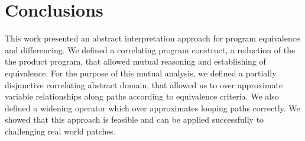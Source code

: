 \section{Conclusions} 

This work presented an abstract interpretation approach for program equivalence and differencing. We defined a correlating program construct, a reduction of the the product program, that allowed mutual reasoning and establishing of equivalence. For the purpose of this mutual analysis, we defined a partially disjunctive correlating abstract domain, that allowed us to over approximate variable relationships along paths according to equivalence criteria. We also defined a widening operator which over approximates looping paths correctly. We showed that this approach is feasible and can be applied successfully to challenging real world patches. 